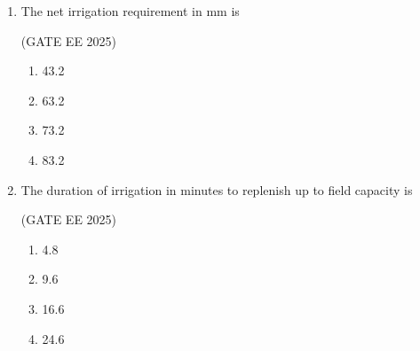 \documentclass[journal,12pt,onecolumn]{IEEEtran}
\theoremstyle{remark}
\begin{document}
\begin{enumerate}
\hfill(GATE EE 2025)

\begin{multicols}{4}
\begin{enumerate}
\item 87
\item 128
\item 157
\item 174
\end{enumerate}
\end{multicols}

A check basin of size 15 m $\times$ 12 m is to be irrigated using a stream of 26 litre per second. The depth of crop root zone is 1.3 m and the apparent specific gravity of the root zone soil is 1.6. The water holding capacity of the soil is 16\%. Irrigation is to be applied when the soil moisture content in the crop root zone attains 12\%. Deep percolation loss is neglected.

\item The net irrigation requirement in mm is

\hfill(GATE EE 2025)

\begin{multicols}{4}
\begin{enumerate}
\item 43.2
\item 63.2
\item 73.2
\item 83.2
\end{enumerate}
\end{multicols}

\item The duration of irrigation in minutes to replenish up to field capacity is

\hfill(GATE EE 2025)

\begin{multicols}{4}
\begin{enumerate}
\item 4.8
\item 9.6
\item 16.6
\item 24.6
\end{enumerate}
\end{multicols}

\end{enumerate}
\end{document}
